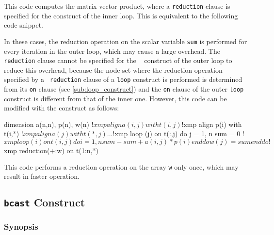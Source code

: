 \begin{description}
This code computes the matrix vector product,
where a {\tt reduction} clause is specified for the {\tt {}}
construct of the inner loop. This is equivalent to the following code
snippet. 


In these cases, the reduction operation on the scalar variable {\tt sum}
is performed for every iteration in the outer loop, which may cause a
large overhead.
The {\tt reduction} clause cannot be specified for the {\tt
{}} construct of the outer loop to reduce this overhead,
%
because the node set where the reduction operation specified by a {\tt
reduction} clause of a {\tt loop} construct is performed is determined
from its {\tt on} clause (see \ref{sub:loop_construct}) and
the {\tt on} clause of the outer {\tt loop} construct is different from
that of the inner one. 
%
However, this code can be modified with the {\tt {}}
construct as follows: 

\begin{Fexample}
      dimension a(n,n), p(n), w(n)
!$xmp align a(i,j) with t(i,j)
!$xmp align p(i) with t(i,*)
!$xmp align a(j) with t(*,j)
      ...
!$xmp loop (j) on t(:,j)
      do j = 1, n
          sum = 0
!$xmp loop (i) on t(i,j) 
          do i = 1, n
              sum - sum + a(i,j) * p(i)
          end do
          w(j) = sum
      end do
!$xmp reduction(+:w) on t(1:n,*)
\end{Fexample}

This code performs a reduction operation on the array {\tt w} only once,
which may result in faster operation.  

\end{description}


\subsection{{\tt bcast} Construct}

\subsubsection*{Synopsis}

